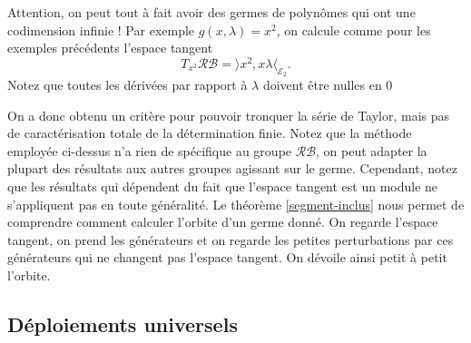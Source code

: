 \documentclass[memoire.tex]{subfiles}
\begin{document}
\begin{exemple}
    Attention, on peut tout à fait avoir des germes de polynômes qui ont une codimension infinie ! Par exemple $g(x,\lambda)=x^2$, on calcule comme pour les exemples précédents l'espace tangent
    \begin{equation*}
        T_{x^2}\mathcal{RB}=\rangle x^2,x\lambda \langle_{\mathcal{E}_2}.
    \end{equation*}
    Notez que toutes les dérivées par rapport à $\lambda$ doivent être nulles en 0
\end{exemple}
On a donc obtenu un critère pour pouvoir tronquer la série de Taylor, mais pas de caractérisation totale de la détermination finie. Notez que
la méthode employée ci-dessus n'a 
rien de spécifique au groupe $\mathcal
{RB}$, on peut adapter la plupart des 
résultats aux autres groupes agissant 
sur le germe. Cependant, notez que 
les résultats qui dépendent du fait 
que l'espace tangent est un module ne 
s'appliquent pas en toute généralité.
Le théorème \ref{segment-inclus} nous permet de comprendre comment calculer l'orbite d'un germe donné. On regarde l'espace tangent, on prend les générateurs et on regarde les petites perturbations par ces générateurs qui ne changent pas l'espace tangent. On dévoile ainsi petit à petit l'orbite.

\subsection{Déploiements universels} 
\end{document}
